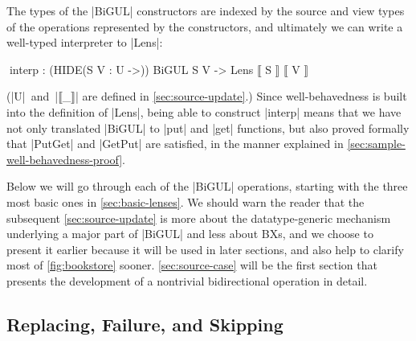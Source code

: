 \documentclass{sigplanconf}
\begin{document}
The types of the |BiGUL| constructors are indexed by the source and view types of the operations represented by the constructors, and ultimately we can write a well-typed interpreter to |Lens|:
\begin{code}
^^^interp : (HIDE({S V : U} ->)) BiGUL S V -> Lens ⟦ S ⟧ ⟦ V ⟧
\end{code}
(|U|~and~|⟦_⟧| are defined in \autoref{sec:source-update}.)
Since well-behavedness is built into the definition of |Lens|, being able to construct |interp| means that we have not only translated |BiGUL| to |put| and |get| functions, but also proved formally that |PutGet| and |GetPut| are satisfied, in the manner explained in \autoref{sec:sample-well-behavedness-proof}.

Below we will go through each of the |BiGUL| operations, starting with the three most basic ones in \autoref{sec:basic-lenses}.
We should warn the reader that the subsequent \autoref{sec:source-update} is more about the datatype-generic mechanism underlying a major part of |BiGUL| and less about BXs, and we choose to present it earlier because it will be used in later sections, and also help to clarify most of \autoref{fig:bookstore} sooner.
\autoref{sec:source-case} will be the first section that presents the development of a nontrivial bidirectional operation in detail.


\subsection{Replacing, Failure, and Skipping}
\label{sec:basic-lenses}
\end{document}
